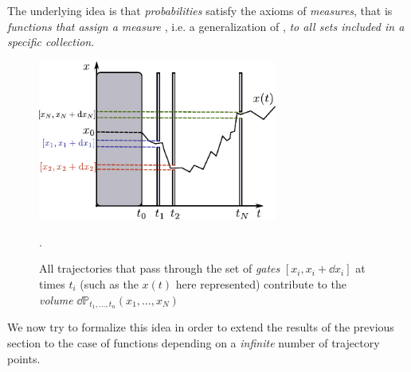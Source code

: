 \documentclass[../template.tex]{subfiles}
\begin{document}
The underlying idea is that \textit{probabilities} satisfy the axioms of \textit{measures}, that is \textit{functions that assign a measure} , i.e. a generalization of , \textit{to all sets included in a specific collection}.


\begin{figure}[H]
    \centering
    \includegraphics[width=0.7\textwidth]{Images/diffusion1.pdf}
    \caption{All trajectories that pass through the set of \textit{gates} $[x_i, x_i + \dd{x_i}]$ at times $t_i$ (such as the $x(t)$ here represented) contribute to the \textit{volume} $\dd{\mathbb{P}}_{t_1, \dots,t_n}(x_1,\dots,x_N)$ \label{fig:gates}}.
\end{figure}

We now try to formalize this idea in order to extend the results of the previous section to the case of functions depending on a \textit{infinite} number of trajectory points.
\end{document}
